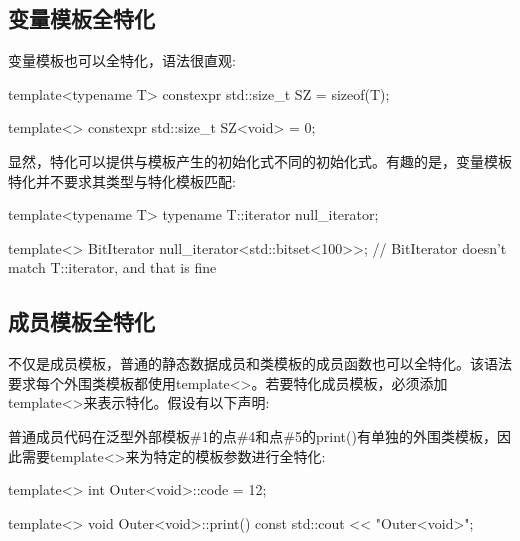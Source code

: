 \subsection{变量模板全特化}

变量模板也可以全特化，语法很直观:

\begin{cpp}
template<typename T> constexpr std::size_t SZ = sizeof(T);

template<> constexpr std::size_t SZ<void> = 0;
\end{cpp}

显然，特化可以提供与模板产生的初始化式不同的初始化式。有趣的是，变量模板特化并不要求其类型与特化模板匹配:

\begin{cpp}
template<typename T> typename T::iterator null_iterator;

template<> BitIterator null_iterator<std::bitset<100>>;
// BitIterator doesn't match T::iterator, and that is fine
\end{cpp}

\subsection{成员模板全特化}

不仅是成员模板，普通的静态数据成员和类模板的成员函数也可以全特化。该语法要求每个外围类模板都使用template<>。若要特化成员模板，必须添加template<>来表示特化。假设有以下声明:


普通成员代码在泛型外部模板\#1的点\#4和点\#5的print()有单独的外围类模板，因此需要template<>来为特定的模板参数进行全特化:

\begin{cpp}
template<>
int Outer<void>::code = 12;

template<>
void Outer<void>::print() const
{
	std::cout << "Outer<void>";
}
\end{cpp}

